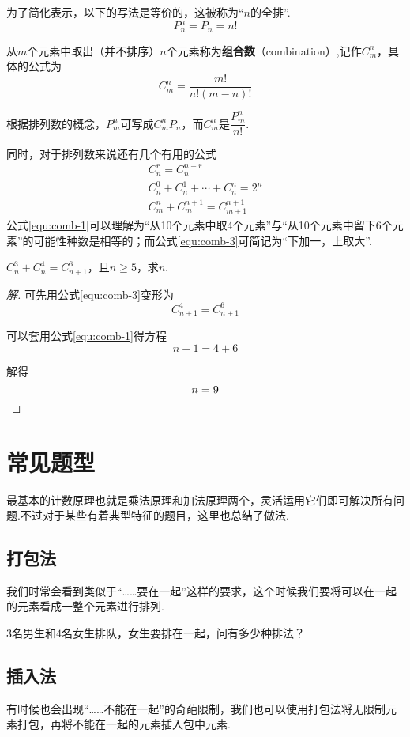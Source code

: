 为了简化表示，以下的写法是等价的，这被称为“$n$的全排”.\[P_n^n=P_n=n!\]

从$m$个元素中取出（并不排序）$n$个元素称为\textbf{组合数}（combination）,记作$C_m^n$，具体的公式为\[C_m^n=\frac{m!}{n!(m-n)!}\]

根据排列数的概念，$P_m^n$可写成$C_m^nP_n$，而$C_m^n$是$\dfrac{P_m^n}{n!}$.

同时，对于排列数来说还有几个有用的公式
\begin{gather}
	C_n^r=C_n^{n-r} \label{equ:comb-1} \\
	C_n^0+C_n^1+\cdots+C_n^n=2^n \label{equ:comb-2} \\
	C_m^n+C_m^{n+1}=C_{m+1}^{n+1} \label{equ:comb-3}
\end{gather}
公式\eqref{equ:comb-1}可以理解为“从10个元素中取4个元素”与“从10个元素中留下6个元素”的可能性种数是相等的；而公式\eqref{equ:comb-3}可简记为“下加一，上取大”.

\begin{example}
	$C_n^3+C_n^4=C_{n+1}^6$，且$n\geq5$，求$n$.
\end{example}

\begin{proof}[解]
	可先用公式\eqref{equ:comb-3}变形为\[C_{n+1}^4=C_{n+1}^6\]

	可以套用公式\eqref{equ:comb-1}得方程\[n+1=4+6\]

	解得\[n=9 \qedhere\]
\end{proof}

\section{常见题型}
最基本的计数原理也就是乘法原理和加法原理两个，灵活运用它们即可解决所有问题.不过对于某些有着典型特征的题目，这里也总结了做法.

\subsection{打包法}
我们时常会看到类似于“\ldots\ldots 要在一起”这样的要求，这个时候我们要将可以在一起的元素看成一整个元素进行排列.

\begin{example}
	$3$名男生和$4$名女生排队，女生要排在一起，问有多少种排法？
\end{example}

\subsection{插入法}
有时候也会出现“\ldots\ldots 不能在一起”的奇葩限制，我们也可以使用打包法将无限制元素打包，再将不能在一起的元素插入包中元素.

